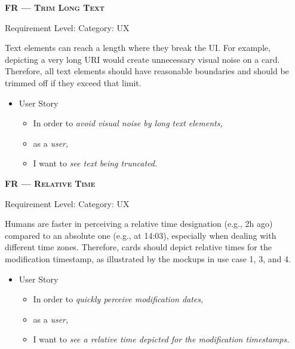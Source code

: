 \centerline{\textbf{FR\textsubscript{} --- \textsc{Trim Long Text}}}
\centerline{\small Requirement Level:  \quad{} Category: \acrshort*{UX}}

\noindent Text elements can reach a length where they break the \acrshort*{UI}. For example, depicting a very long \acrshort*{URI} would create unnecessary visual noise on a card. Therefore, all text elements should have reasonable boundaries and should be trimmed off if they exceed that limit.

\begin{itemize}[after=\vspace{1em}]
    \setlength\itemsep{-0.5em}
	\item[] User Story\\[-7.8mm]
	\begin{itemize}
    \setlength\itemsep{-0.5em}
        \item[] In order to \textit{avoid visual noise by long text elements,}
        \item[] as a \textit{user,}
        \item[] I want to \textit{see text being truncated.}
    \end{itemize}
\end{itemize}




\centerline{\textbf{FR\textsubscript{} --- \textsc{Relative Time}}}
\centerline{\small Requirement Level:  \quad{} Category: \acrshort*{UX}}

\noindent Humans are faster in perceiving a relative time designation (e.g., 2h ago) compared to an absolute one (e.g., at 14:03), especially when dealing with different time zones. Therefore, cards should depict relative times for the modification timestamp, as illustrated by the mockups in use case 1, 3, and 4.

\begin{itemize}[after=\vspace{1em}]
    \setlength\itemsep{-0.5em}
	\item[] User Story\\[-7.8mm]
	\begin{itemize}
    \setlength\itemsep{-0.5em}
        \item[] In order to \textit{quickly perceive modification dates,}
        \item[] as a \textit{user,}
        \item[] I want to \textit{see a relative time depicted for the modification timestamps.}
    \end{itemize}
\end{itemize}


